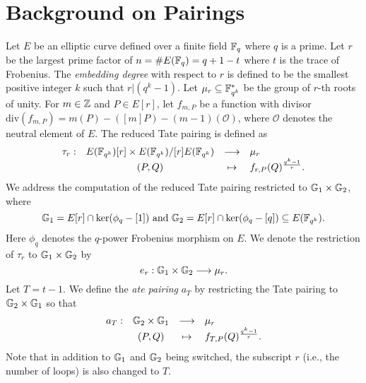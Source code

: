 \section{Background on Pairings}
\label{sec:background}

Let $E$ be an elliptic curve defined over a finite field $\mathbb{F}_{q}$ where $q$ is a prime.
Let $r$ be the largest prime factor of $n = \#E(\mathbb{F}_{q}) = q + 1 - t$ where $t$ is the trace of Frobenius.
The \emph{embedding degree} with respect to $r$ is defined to be the smallest positive integer $k$ such that $r | (q^k-1)$.
Let $\mu_{r} \subseteq \mathbb{F}_{q^{k}}^{*}$ be the group of $r$-th roots of unity.
For $m \in \mathbb{Z}$ and $P \in E[r]$,
let $f_{m,P}$ be a function with divisor 
$\text{div}(f_{m,P}) = m(P) - ([m]P) - (m-1)(\mathcal{O})$,
where $\mathcal{O}$ denotes the neutral element of $E$.
The reduced Tate pairing is defined as
\[\begin{array}{rccl}
\tau_{r} :	& E(\mathbb{F}_{q^{k}})[r] \times E(\mathbb{F}_{q^{k}})/[r]E(\mathbb{F}_{q^{k}})	& \longrightarrow	& \mu_{r} \\
		& (P,Q)								& \mapsto		& f_{r,P}(Q)^{\frac{q^{k}-1}{r}}.
\end{array}\]
We address the computation of the reduced Tate pairing restricted to $\mathbb{G}_{1} \times \mathbb{G}_{2}$, where
$$\mathbb{G}_{1} = E[r] \cap \ker(\phi_{q}-[1]) \text{ and }
\mathbb{G}_{2} = E[r] \cap \ker(\phi_{q} - [q]) \subseteq E(\mathbb{F}_{q^{k}}).$$
Here $\phi_{q}$ denotes the $q$-power Frobenius morphism on $E$.
We denote the restriction of $\tau_{r}$ to $\mathbb{G}_{1} \times \mathbb{G}_{2}$ by
$$e_{r} : \mathbb{G}_{1} \times \mathbb{G}_{2} \longrightarrow \mu_{r}.$$
Let $T = t-1$.
We define the \emph{ate pairing} $a_{T}$ by restricting the Tate pairing to $\mathbb{G}_{2} \times \mathbb{G}_{1}$ so that
\[\begin{array}{rccl}
a_{T} :	& \mathbb{G}_{2} \times \mathbb{G}_{1}	& \longrightarrow	& \mu_{r} \\
	& (P,Q) 		& \mapsto		& f_{T,P}(Q)^{\frac{q^{k}-1}{r}}.
\end{array}\]
Note that in addition to $\mathbb{G}_{1}$ and $\mathbb{G}_{2}$ being switched, the subscript $r$ (i.e., the number of loops) is also changed to $T$.


